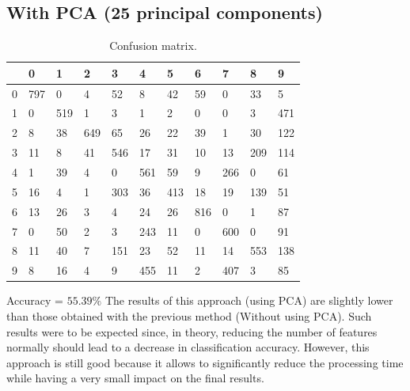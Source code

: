 \documentclass[12pt]{article}
\begin{document}
		\subsection{With PCA (25 principal components)}
			\begin{table}[h]
				\centering
				\caption{Confusion matrix.}
				\label{tab:my-table}
				\begin{tabular}{l|llllllllll}
					& 0   & 1   & 2   & 3   & 4   & 5   & 6   & 7   & 8   & 9   \\ \hline
					0 & 797 & 0   & 4   & 52  & 8   & 42  & 59  & 0   & 33  & 5   \\
					1 & 0   & 519 & 1   & 3   & 1   & 2   & 0   & 0   & 3   & 471 \\
					2 & 8   & 38  & 649 & 65  & 26  & 22  & 39  & 1   & 30  & 122 \\
					3 & 11  & 8   & 41  & 546 & 17  & 31  & 10  & 13  & 209 & 114 \\
					4 & 1   & 39  & 4   & 0   & 561 & 59  & 9   & 266 & 0   & 61  \\
					5 & 16  & 4   & 1   & 303 & 36  & 413 & 18  & 19  & 139 & 51  \\
					6 & 13  & 26  & 3   & 4   & 24  & 26  & 816 & 0   & 1   & 87  \\
					7 & 0   & 50  & 2   & 3   & 243 & 11  & 0   & 600 & 0   & 91  \\
					8 & 11  & 40  & 7   & 151 & 23  & 52  & 11  & 14  & 553 & 138 \\
					9 & 8   & 16  & 4   & 9   & 455 & 11  & 2   & 407 & 3   & 85 
				\end{tabular}
			\end{table}
		
			Accuracy = $55.39 \%$
			The results of this approach (using PCA) are slightly lower than those obtained with the previous method (Without using PCA). Such results were to be expected since, in theory, reducing the number of features normally should lead to a decrease in classification accuracy. However, this approach is still good because it allows to significantly reduce the processing time while having a very small impact on the final results.
	
\end{document}
